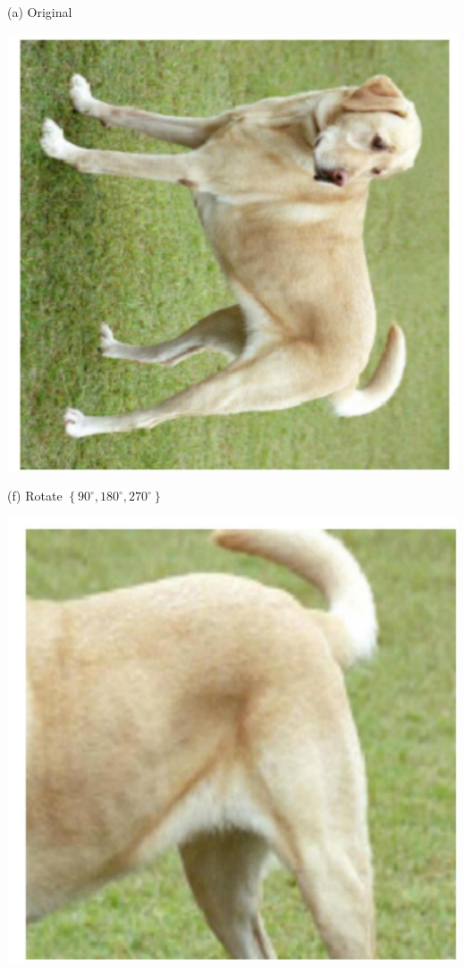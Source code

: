 \documentclass[10pt]{article}
\begin{document}
(a) Original

\begin{center}
\includegraphics[max width=\textwidth]{2024_01_08_959e2db67a31f073f6d2g-24(1)}
\end{center}

(f) Rotate $\left\{90^{\circ}, 180^{\circ}, 270^{\circ}\right\}$

\begin{center}
\includegraphics[max width=\textwidth]{2024_01_08_959e2db67a31f073f6d2g-24}
\end{center}
\end{document}
